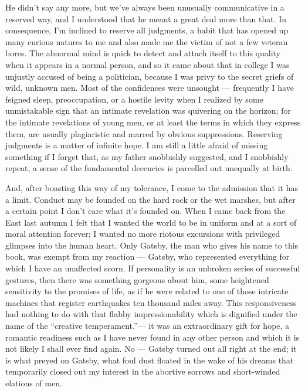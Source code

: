 \documentclass{znotebook}
\begin{document}
He didn’t say any more, but we’ve always been unusually communicative in a reserved way, and I understood that he meant a great deal more than that. In consequence, I’m inclined to reserve all judgments, a habit that has opened up many curious natures to me and also made me the victim of not a few veteran bores. The abnormal mind is quick to detect and attach itself to this quality when it appears in a normal person, and so it came about that in college I was unjustly accused of being a politician, because I was privy to the secret griefs of wild, unknown men. Most of the confidences were unsought — frequently I have feigned sleep, preoccupation, or a hostile levity when I realized by some unmistakable sign that an intimate revelation was quivering on the horizon; for the intimate revelations of young men, or at least the terms in which they express them, are usually plagiaristic and marred by obvious suppressions. Reserving judgments is a matter of infinite hope. I am still a little afraid of missing something if I forget that, as my father snobbishly suggested, and I snobbishly repeat, a sense of the fundamental decencies is parcelled out unequally at birth.

And, after boasting this way of my tolerance, I come to the admission that it has a limit. Conduct may be founded on the hard rock or the wet marshes, but after a certain point I don’t care what it’s founded on. When I came back from the East last autumn I felt that I wanted the world to be in uniform and at a sort of moral attention forever; I wanted no more riotous excursions with privileged glimpses into the human heart. Only Gatsby, the man who gives his name to this book, was exempt from my reaction — Gatsby, who represented everything for which I have an unaffected scorn. If personality is an unbroken series of successful gestures, then there was something gorgeous about him, some heightened sensitivity to the promises of life, as if he were related to one of those intricate machines that register earthquakes ten thousand miles away. This responsiveness had nothing to do with that flabby impressionability which is dignified under the name of the ``creative temperament.''— it was an extraordinary gift for hope, a romantic readiness such as I have never found in any other person and which it is not likely I shall ever find again. No — Gatsby turned out all right at the end; it is what preyed on Gatsby, what foul dust floated in the wake of his dreams that temporarily closed out my interest in the abortive sorrows and short-winded elations of men.
\end{document}
